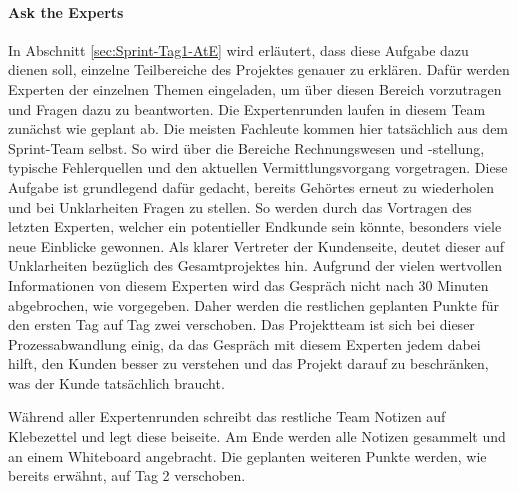 \paragraph{Ask the Experts}
In Abschnitt \ref{sec:Sprint-Tag1-AtE} wird erläutert, dass diese Aufgabe dazu dienen soll, einzelne Teilbereiche des Projektes genauer zu erklären. Dafür werden Experten der einzelnen Themen eingeladen, um über diesen Bereich vorzutragen und Fragen dazu zu beantworten. 
Die Expertenrunden laufen in diesem Team zunächst wie geplant ab. Die meisten Fachleute kommen hier tatsächlich aus dem Sprint-Team selbst. So wird über die Bereiche Rechnungswesen und -stellung, typische Fehlerquellen und den aktuellen Vermittlungsvorgang vorgetragen. Diese Aufgabe ist grundlegend dafür gedacht, bereits Gehörtes erneut zu wiederholen und bei Unklarheiten Fragen zu stellen. So werden durch das Vortragen des letzten Experten, welcher ein potentieller Endkunde sein könnte, besonders viele neue Einblicke gewonnen. Als klarer Vertreter der Kundenseite, deutet dieser auf Unklarheiten bezüglich des Gesamtprojektes hin. Aufgrund der vielen wertvollen Informationen von diesem Experten wird das Gespräch nicht nach 30 Minuten abgebrochen, wie vorgegeben. Daher werden die restlichen geplanten Punkte für den ersten Tag auf Tag zwei verschoben. Das Projektteam ist sich bei dieser Prozessabwandlung einig, da das Gespräch mit diesem Experten jedem dabei hilft, den Kunden besser zu verstehen und das Projekt darauf zu beschränken, was der Kunde tatsächlich braucht.

Während aller Expertenrunden schreibt das restliche Team Notizen auf Klebezettel und legt diese beiseite. Am Ende werden alle Notizen gesammelt und an einem Whiteboard angebracht. Die geplanten weiteren Punkte werden, wie bereits erwähnt, auf Tag 2 verschoben.
%
%
%
%
%
%

